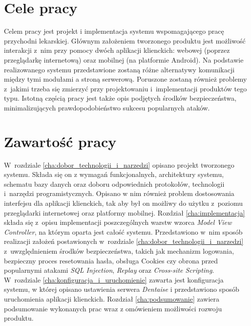 \documentclass[11pt]{aghdpl}
\begin{document}
\section{Cele pracy}
\label{sec:cele_pracy}

Celem pracy jest projekt i implementacja systemu wspomagającego pracę przychodni lekarskiej. Głównym założeniem tworzonego produktu jest możliwość interakcji z~nim przy pomocy dwóch aplikacji klienckich: webowej (poprzez przeglądarkę internetową) oraz mobilnej (na platformie Android). Na podstawie realizowanego systemu przedstawione zostaną różne alternatywy komunikacji między tymi modułami a stroną serwerową. Poruszone zostaną również problemy z~jakimi trzeba się zmierzyć przy projektowaniu i~implementacji produktów tego typu. Istotną częścią pracy jest także opis podjętych środków bezpieczeństwa, minimalizujących prawdopodobieństwo sukcesu popularnych ataków.

\section{Zawartość pracy}
\label{sec:zawartosc_pracy}

W~rozdziale \ref{cha:dobor_technologii_i_narzedzi} opisano projekt tworzonego systemu. Składa się on z wymagań funkcjonalnych, architektury systemu, schematu bazy danych oraz doboru odpowiednich protokołów, technologii i~narzędzi programistycznych. Opisano w nim również problem dostosowania interfejsu dla aplikacji klienckich, tak aby był on możliwy do użytku z~poziomu przeglądarki internetowej oraz platformy mobilnej. Rozdział \ref{cha:implementacja} składa się z~opisu implementacji poszczególnych warstw wzorca \emph{Model View Controller}, na którym oparta jest całość systemu. Przedstawiono w~nim sposób realizacji założeń postawionych w~rozdziale \ref{cha:dobor_technologii_i_narzedzi} z~uwzględnieniem środków bezpieczeństwa, takich jak mechanizm logowania, bezpieczny proces resetowania hasła, obsługa Cookies czy obrona przed popularnymi atakami \emph{SQL Injection}, \emph{Replay} oraz \emph{Cross-site Scripting}. W~rozdziale \ref{cha:konfiguracja_i_uruchomienie} zawarta jest konfiguracja systemu, w której opisano ustawienia serwera \emph{Dentaise} i przedstawiono sposób uruchomienia aplikacji klienckich. Rozdział \ref{cha:podsumowanie} zawiera podsumowanie wykonanych prac wraz z omówieniem możliwości rozwoju produktu.

\end{document}
